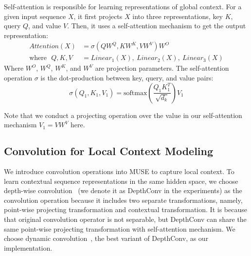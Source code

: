 \documentclass{article} %
\begin{document}
Self-attention is responsible for  learning representations of global context.
 For a given input sequence $X$, it first projects $X$ into three representations, key $K$, query $Q$, and value $V$. Then, it uses a self-attention mechanism to get the output representation:
\begin{equation}
\begin{split}
 Attention(X) & =  \sigma(QW^Q,KW^K, VW^V)W^O   \\
\text{where}\ \ \ Q, K, V & = Linear_1(X), \ Linear_2(X), \ Linear_3(X) 
\end{split}
\end{equation}
Where $W^O$, $W^Q$, $W^K$, and $W^V$ are projection parameters. The self-attention operation $\sigma$ is the dot-production between key, query, and value pairs:
\begin{equation}
 \sigma(Q_1, K_1, V_1) = \text{softmax}(\frac{Q_1K_1^T}{\sqrt{d_k}})V_1
\end{equation}

Note that we conduct a projecting operation over the value in our self-attention mechanism $V_1=VW^V$ here.

\subsection{Convolution for Local Context Modeling} 
We introduce convolution operations into MUSE to capture local context. To learn contextual sequence representations in the same hidden space, we choose depth-wise convolution~\citep{Chollet_2017} (we denote it as DepthConv in the experiments) as the convolution operation because it includes two separate transformations, namely, point-wise projecting transformation and contextual transformation. It is because that original convolution operator is not separable, but DepthConv can share the same point-wise projecting transformation with  self-attention mechanism. We choose dynamic convolution~\citep{wu2019pay}, the best variant of DepthConv, as our implementation. 
\end{document}

